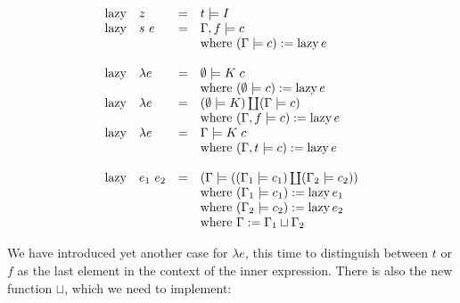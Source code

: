 \documentclass[conference]{IEEEtran}
\DeclareMathOperator{\lazy}{lazy}
\begin{document}
\begin{equation*}
    \begin{array}{l l l l}
        \lazy & z         & = & t \models I                                                             \\
        \lazy & s \ e     & = & \Gamma,f \models c                                                      \\
              &           &   & \text{where } (\Gamma \models c) := \lazy e                             \\
        \\
        \lazy & \lambda e & = & \emptyset \models K \; c                                                \\
              &           &   & \text{where } (\emptyset \models c) := \lazy e                          \\
        \lazy & \lambda e & = & (\emptyset \models K) \coprod (\Gamma \models c)                        \\
              &           &   & \text{where } (\Gamma,f \models c) := \lazy e                           \\
        \lazy & \lambda e & = & \Gamma \models K \; c                                                   \\
              &           &   & \text{where } (\Gamma,t \models c) := \lazy e                           \\
        \\
        \lazy & e_1 \ e_2 & = & (\Gamma \models ((\Gamma_1 \models c_1) \coprod (\Gamma_2 \models c_2)) \\
              &           &   & \text{where } (\Gamma_1 \models c_1) := \lazy e_1                       \\
              &           &   & \text{where } (\Gamma_2 \models c_2) := \lazy e_2                       \\
              &           &   & \text{where } \Gamma := \Gamma_1 \sqcup \Gamma_2                        \\
    \end{array}
\end{equation*}

We have introduced yet another case for $\lambda e$, this time to distinguish between $t$ or $f$ as the last element in the context of the inner expression.
There is also the new function $\sqcup$, which we need to implement:
\end{document}
